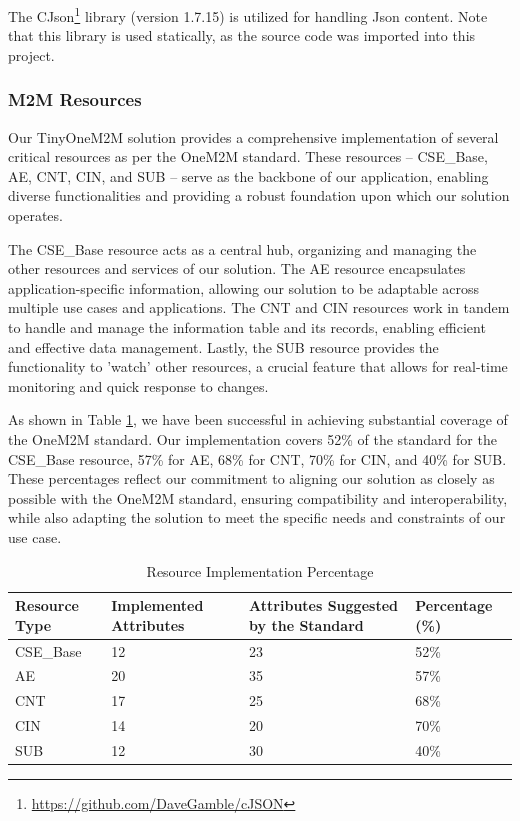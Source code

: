 \documentclass[a4paper,fleqn]{cas-dc}
\begin{document}
The CJson\footnote{\url{https://github.com/DaveGamble/cJSON}} library (version 1.7.15) is utilized for handling Json content. Note that this library is used statically, as the source code was imported into this project.

\subsubsection{M2M Resources}\label{sec:m2mresources}

Our TinyOneM2M solution provides a comprehensive implementation of several critical resources as per the OneM2M standard. These resources -- CSE\_Base, AE, CNT, CIN, and SUB -- serve as the backbone of our application, enabling diverse functionalities and providing a robust foundation upon which our solution operates.

The CSE\_Base resource acts as a central hub, organizing and managing the other resources and services of our solution. The AE resource encapsulates application-specific information, allowing our solution to be adaptable across multiple use cases and applications. The CNT and CIN resources work in tandem to handle and manage the information table and its records, enabling efficient and effective data management. Lastly, the SUB resource provides the functionality to 'watch' other resources, a crucial feature that allows for real-time monitoring and quick response to changes.

As shown in Table \ref{tab:resourceimplementationpercentage}, we have been successful in achieving substantial coverage of the OneM2M standard. Our implementation covers 52\% of the standard for the CSE\_Base resource, 57\% for AE, 68\% for CNT, 70\% for CIN, and 40\% for SUB. These percentages reflect our commitment to aligning our solution as closely as possible with the OneM2M standard, ensuring compatibility and interoperability, while also adapting the solution to meet the specific needs and constraints of our use case.

\begin{table}[h]
\scriptsize
\centering
\caption{Resource Implementation Percentage}
\label{tab:resourceimplementationpercentage}
\begin{tabular}{p{1.5cm}p{1.5cm}p{1.5cm}p{1.5cm}}
\hline
\textbf{Resource Type} & \textbf{Implemented Attributes} & \textbf{Attributes Suggested by the Standard} & \textbf{Percentage (\%)} \\
\hline \hline
CSE\_Base & 12 & 23 & 52\% \\
AE & 20 & 35 & 57\% \\
CNT & 17 & 25 & 68\% \\
CIN & 14 & 20 & 70\% \\
SUB & 12 & 30 & 40\% \\
\hline
\end{tabular}
\end{table}
\end{document}

